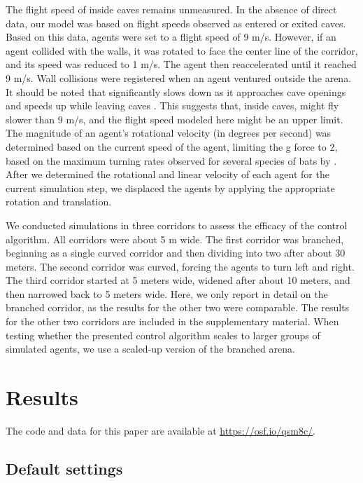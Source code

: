\documentclass[a4paper, 11pt]{article}
\begin{document}
The flight speed of  inside caves remains unmeasured. In the absence of direct data, our model was based on flight speeds observed as  entered \citep{Kloepper2017} or exited \citep{Theriault2010,Pudlo2019} caves. Based on this data, agents were set to a flight speed of 9 m/s. However, if an agent collided with the walls, it was rotated to face the center line of the corridor, and its speed was reduced to 1 m/s. The agent then reaccelerated until it reached 9 m/s. Wall collisions were registered when an agent ventured outside the arena. It should be noted that  significantly slows down as it approaches cave openings \citep{Pudlo2019} and speeds up while leaving caves \citep{Kloepper2017}. This suggests that, inside caves,  might fly slower than 9 m/s, and the flight speed modeled here might be an upper limit. The magnitude of an agent's rotational velocity (in degrees per second) was determined based on the current speed of the agent, limiting the g force to 2, based on the maximum turning rates observed for several species of bats by \citet{Holderied2001}. After we determined the rotational and linear velocity of each agent for the current simulation step, we displaced the agents by applying the appropriate rotation and translation.

We conducted simulations in three corridors to assess the efficacy of the control algorithm. All corridors were about 5 m wide. The first corridor was branched, beginning as a single curved corridor and then dividing into two after about 30 meters. The second corridor was curved, forcing the agents to turn left and right. The third corridor started at 5 meters wide, widened after about 10 meters, and then narrowed back to 5 meters wide. Here, we only report in detail on the branched corridor, as the results for the other two were comparable. The results for the other two corridors are included in the supplementary material. When testing whether the presented control algorithm scales to larger groups of simulated agents, we use a scaled-up version of the branched arena.

\section{Results}

The code and data for this paper are available at \url{https://osf.io/qsm8c/}.

\subsection{Default settings}
\end{document}
